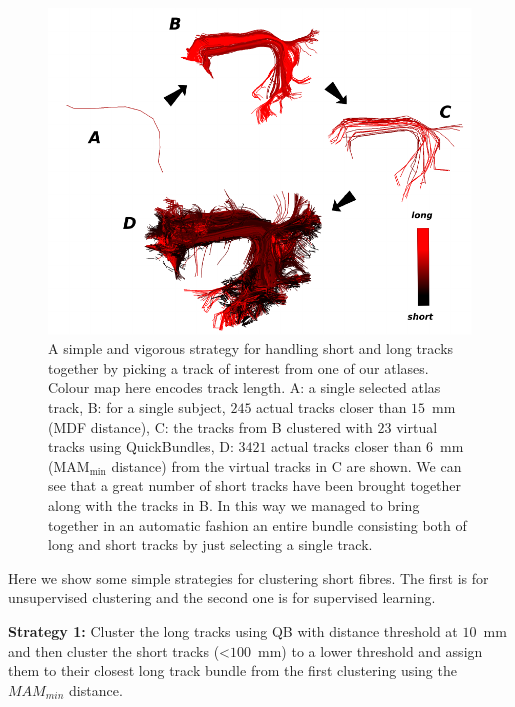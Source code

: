 \documentclass[journal]{IEEEtran}
\begin{document}
%
\begin{figure}
\begin{centering}
\includegraphics[scale=0.65]{Fig_10_arcuate_small_fibers}
\par\end{centering}
\caption{A simple and vigorous strategy for handling short and long
  tracks together by picking a track of interest from one of our
  atlases. Colour map here encodes track length. A: a single selected
  atlas track, B: for a single subject, $245$ actual tracks closer than
  $15$~mm (MDF distance), C: the tracks from B clustered with $23$
  virtual tracks using QuickBundles, D: $3421$ actual tracks closer than $6$~mm
  ($\textrm{MAM}_{\textrm{min}}$ distance) from the virtual tracks in C
  are shown. We can see that a great number of short tracks have been
  brought together along with the tracks in B. In this way we managed to
  bring together in an automatic fashion an entire bundle consisting both of long and short
  tracks by just selecting a single track.\label{Flo:arcuate_close}}
\end{figure}

Here we show some simple strategies for clustering short fibres. The first
is for unsupervised clustering and the second one is for supervised
learning.

\textbf{Strategy 1:} Cluster the long tracks using QB with distance
threshold at $10$~mm and then cluster the short tracks (<$100$~mm) to a
lower threshold and assign them to their closest long track bundle from
the first clustering using the $MAM_{min}$ distance.
\end{document}

